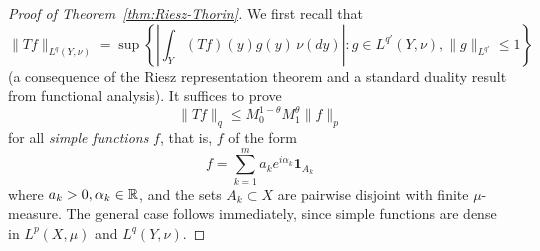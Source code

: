 \begin{proof}[Proof of Theorem~\ref{thm:Riesz-Thorin}]
We first recall that
\begin{equation*}
    \|Tf\|_{L^q(Y,\nu)} = \sup\left\{ \left|\int_Y (Tf)(y)g(y)\,\nu(dy)\right| : g\in L^{q'}(Y,\nu), \|g\|_{L^{q'}}\le 1 \right\}
\end{equation*}
(a consequence of the Riesz representation theorem and a standard duality result from functional analysis). It suffices to prove
\begin{equation*}
    \|Tf\|_q \le M_0^{1-\theta}M_1^\theta\|f\|_p
\end{equation*}
for all \emph{simple functions} $f$, that is, $f$ of the form
\begin{equation*}
    f = \sum_{k=1}^m a_k e^{i\alpha_k} \mathbf{1}_{A_k}
\end{equation*}
where $a_k>0, \alpha_k\in\mathbb{R}$, and the sets $A_k \subset X$ are pairwise disjoint with finite $\mu$-measure. The general case follows immediately, since simple functions are dense in $L^p(X,\mu)$ and $L^q(Y,\nu)$.


\end{proof}
